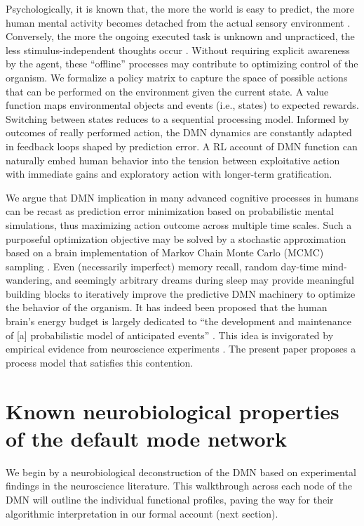 \documentclass[10pt,letterpaper]{article}
\begin{document}
Psychologically,
it is known that, the more the world is easy to predict,
the more human mental activity
becomes detached from the actual sensory environment
\citep{antrobus1966studies, pope1978regulation}.
Conversely,
the more the ongoing executed task is unknown and unpracticed,
the less stimulus-independent thoughts occur
\citep{filler1973daydreaming, teasdale1995stimulus, christoff2016mind}.
Without requiring explicit awareness by the agent,
these ``offline'' processes may contribute
to optimizing control of the organism.
We formalize
a policy matrix to capture the space of possible actions that can be performed
on the environment given the current state. A value function
maps environmental objects and events (i.e., states) to expected rewards.
Switching between states reduces to a sequential processing model.
Informed by outcomes of really performed action,
the DMN dynamics are constantly adapted in feedback loops
shaped by prediction error.
A RL account of DMN function can naturally embed human behavior
into the tension between exploitative action with immediate gains and
exploratory action with longer-term gratification.



We argue that DMN implication in many
advanced cognitive processes in humans
can be recast as prediction error minimization
based on probabilistic mental simulations,
thus maximizing action outcome across multiple time scales.
Such a purposeful optimization objective
may be solved by a stochastic approximation
based on a brain implementation of Markov Chain Monte Carlo (MCMC) sampling
\citep{tenenbaum2011grow}.
Even (necessarily imperfect) memory recall,
random day-time mind-wandering, and
seemingly arbitrary dreams during sleep
may provide meaningful building blocks to iteratively improve
the predictive DMN machinery to optimize the behavior of the organism.
%
It has indeed been proposed that
the human brain's energy budget is largely dedicated to
``the development and maintenance of [a]
probabilistic model of anticipated events''
\citep{raichle2005intrinsic}.
This idea is invigorated by
empirical evidence from
neuroscience experiments \citep{kording2004bayesian, fiser2004small}.
The present paper proposes a
process model that satisfies this contention.




\section{Known neurobiological properties of the default mode network}
We begin by a neurobiological deconstruction of the DMN
based on experimental findings in the neuroscience literature.
This walkthrough across each node of the DMN will
outline the individual functional profiles,
paving the way for their algorithmic interpretation
in our formal account (next section).
\end{document}
